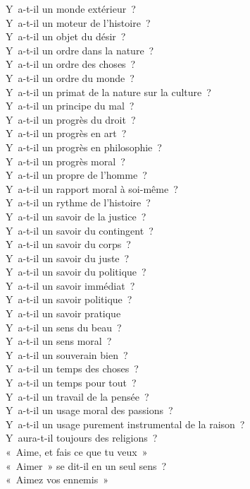\documentclass[a4paper,12pt]{article}
\begin{document}
Y a-t-il un monde extérieur ? \\
Y a-t-il un moteur de l'histoire ? \\
Y a-t-il un objet du désir ? \\
Y a-t-il un ordre dans la nature ? \\
Y a-t-il un ordre des choses ? \\
Y a-t-il un ordre du monde ? \\
Y a-t-il un primat de la nature sur la culture ? \\
Y a-t-il un principe du mal ? \\
Y a-t-il un progrès du droit ? \\
Y a-t-il un progrès en art ? \\
Y a-t-il un progrès en philosophie ? \\
Y a-t-il un progrès moral ? \\
Y a-t-il un propre de l'homme ? \\
Y a-t-il un rapport moral à soi-même ? \\
Y a-t-il un rythme de l'histoire ? \\
Y a-t-il un savoir de la justice ? \\
Y a-t-il un savoir du contingent ? \\
Y a-t-il un savoir du corps ? \\
Y a-t-il un savoir du juste ? \\
Y a-t-il un savoir du politique ? \\
Y a-t-il un savoir immédiat ? \\
Y a-t-il un savoir politique ? \\
Y a-t-il un savoir pratique \\
Y a-t-il un sens du beau ? \\
Y a-t-il un sens moral ? \\
Y a-t-il un souverain bien ? \\
Y a-t-il un temps des choses ? \\
Y a-t-il un temps pour tout ? \\
Y a-t-il un travail de la pensée ? \\
Y a-t-il un usage moral des passions ? \\
Y a-t-il un usage purement instrumental de la raison ? \\
Y aura-t-il toujours des religions ? \\
« Aime, et fais ce que tu veux » \\
« Aimer » se dit-il en un seul sens ? \\
« Aimez vos ennemis » \\
\end{document}
